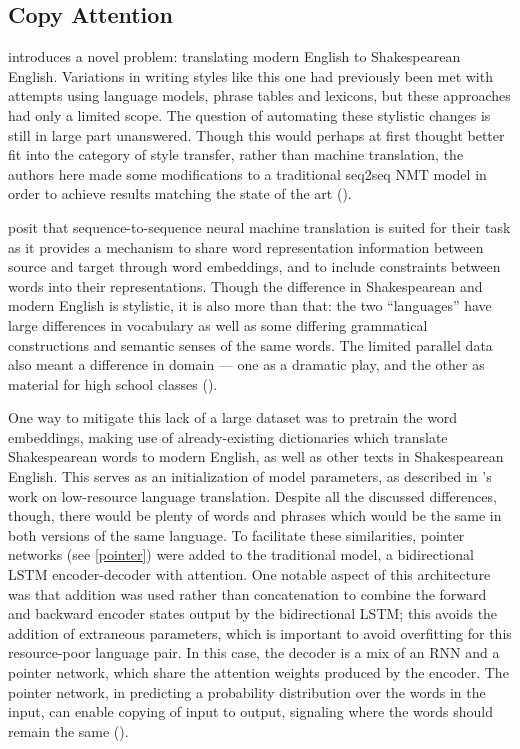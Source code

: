 \subsection{Copy Attention}

\cite{jhamtani2017copy} introduces a novel problem: translating modern English to Shakespearean English. Variations in writing styles like this one had previously been met with attempts using language models, phrase tables and lexicons, but these approaches had only a limited scope. The question of automating these stylistic changes is still in large part unanswered. Though this would perhaps at first thought better fit into the category of style transfer, rather than machine translation, the authors here made some modifications to a traditional seq2seq NMT model in order to achieve results matching the state of the art (\cite{jhamtani2017copy}). 

\cite{jhamtani2017copy} posit that sequence-to-sequence neural machine translation is suited for their task as it provides a mechanism to share word representation information between source and target through word embeddings, and to include constraints between words into their representations. Though the difference in Shakespearean and modern English is stylistic, it is also more than that: the two ``languages'' have large differences in vocabulary as well as some differing grammatical constructions and semantic senses of the same words. The limited parallel data also meant a difference in domain --- one as a dramatic play, and the other as material for high school classes (\cite{jhamtani2017copy}).

One way to mitigate this lack of a large dataset was to pretrain the word embeddings, making use of already-existing dictionaries which translate Shakespearean words to modern English, as well as other texts in Shakespearean English. This serves as an initialization of model parameters, as described in \cite{lample2018unsupervised}'s work on low-resource language translation. Despite all the discussed differences, though, there would be plenty of words and phrases which would be the same in both versions of the same language. To facilitate these similarities, pointer networks (see \ref{pointer}) were added to the traditional model, a bidirectional LSTM encoder-decoder with attention. One notable aspect of this architecture was that addition was used rather than concatenation to combine the forward and backward encoder states output by the bidirectional LSTM; this avoids the addition of extraneous parameters, which is important to avoid overfitting for this resource-poor language pair. In this case, the decoder is a mix of an RNN and a pointer network, which share the attention weights produced by the encoder. The pointer network, in predicting a probability distribution over the words in the input, can enable copying of input to output, signaling where the words should remain the same (\cite{jhamtani2017copy}).

